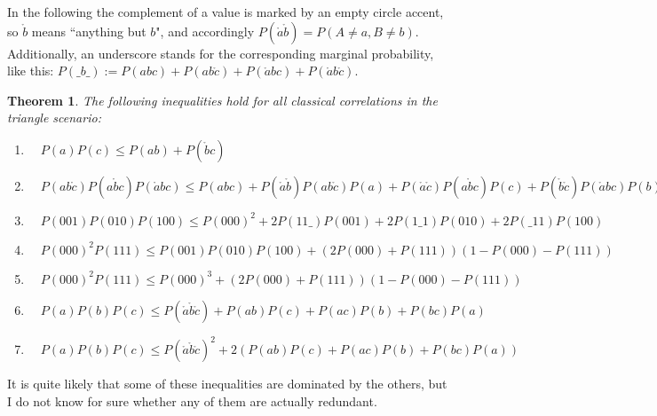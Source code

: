 \documentclass[aps,english,superscriptaddress,twocolumn,twoside,prl]{revtex4-1}%
\newcommand{\defin}{:=}
\theoremstyle{plain}
\newtheorem{thm}{Theorem}%
\theoremstyle{definition}
\theoremstyle{remark}
\numberwithin{equation}{section}
\newcommand{\na}{\ensuremath{\mathring{a}}}
\newcommand{\nb}{\ensuremath{\mathring{b}}}
\newcommand{\nc}{\ensuremath{\mathring{c}}}
\begin{document}
In the following the complement of a value is marked by an empty circle accent, so $\mathring{b}$ means ``anything but $b$", and accordingly $P(\mathring{a}\mathring{b})=P(A\mathopen{\neq}a,B\mathopen{\neq}b)$. Additionally, an underscore stands for the corresponding marginal probability, like this: $P(\_b\_)\defin P(abc) + P(ab\mathring{c}) + P(\mathring{a}bc) + P(\mathring{a}b\mathring{c})$. 
\begin{thm}
The following inequalities hold for all classical correlations in the triangle scenario:
\begin{enumerate}
\item
\(\quad
P(a) P(c)  \leq  P(ab) + P(\nb c)
\)
\item
\(\quad
P(a b\nc) P(a \nb c) P(\na b c) \leq P(a b c) + P(\na \nb) P(a b \nc) P(a) + P(\na\nc) P(a\nb c) P(c)  + P(\nb \nc) P(\na b c) P(b)
\)
\item 
\(\quad
P(001) P(010) P(100) \leq  P(000)^2 + 2 P(11\_) P(001) + 2 P(1\_1) P(010)
+ 2 P(\_11) P(100)
\)
\item
\(\quad
P(000)^2 P(111)  \leq  P(001) P(010) P(100) + (2 P(000) + P(111)) (1 -
P(000) - P(111))
\)
\item
\(\quad
P(000)^2 P(111)  \leq  P(000)^3 + (2 P(000) + P(111)) (1 - P(000) - P(111))
\)
\item
\(\quad
P(a) P(b) P(c) \leq  P(\na\nb\nc) + P(a b) P(c) + P(a c) P(b) + P(b c) P(a)
\)
\item
\(\quad
P(a) P(b) P(c) \leq  P(\na\nb\nc)^2 +2\left( P(a b) P(c) + P(a c) P(b) + P(b c) P(a) \right)
\)
\end{enumerate}
\end{thm}

It is quite likely that some of these inequalities are dominated by the others, but I do not know for sure whether any of them are actually redundant.
\end{document}
